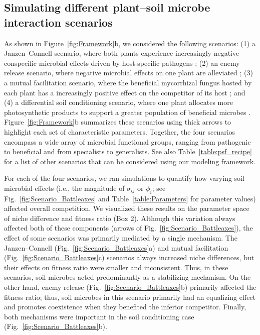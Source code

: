 \subsection{Simulating different plant--soil microbe interaction scenarios}
As shown in Figure~\ref{fig:Framework}b, we considered the following scenarios: (1) a Janzen--Connell scenario, where both plants experience increasingly negative conspecific microbial effects driven by host-specific pathogens \citep{Janzen1970, Connell1971}; (2) an enemy release scenario, where negative microbial effects on one plant are alleviated \citep{Keane2002, Reinhart2006}; (3) a mutual facilitation scenario, where the beneficial mycorrhizal fungus hosted by each plant has a increasingly positive effect on the competitor of its host \citep{Bever2002}; and (4) a differential soil conditioning scenario, where one plant allocates more photosynthetic products to support a greater population of beneficial microbes \citep{Zheng2015, Norby1987}. Figure~\ref{fig:Framework}b summarizes these scenarios using thick arrows to highlight each set of characteristic parameters. Together, the four scenarios encompass a wide array of microbial functional groups, ranging from pathogenic to beneficial and from specialists to generalists. See also Table~\ref{table:psf_recipe} for a list of other scenarios that can be considered using our modeling framework.
\par


For each of the four scenarios, we ran simulations to quantify how varying soil microbial effects (i.e., the magnitude of $\sigma_{ij}$ or $\phi_{i}$; see Fig.~\ref{fig:Scenario_Battleaxes} and Table~\ref{table:Parameters} for parameter values) affected overall competition.
We visualized these results on the parameter space of niche difference and fitness ratio (Box 2). Although this variation always affected both of these components (arrows of Fig.~\ref{fig:Scenario_Battleaxes}), the effect of some scenarios was primarily mediated by a single mechanism.
The Janzen--Connell (Fig.~\ref{fig:Scenario_Battleaxes}a) and mutual facilitation (Fig.~\ref{fig:Scenario_Battleaxes}c) scenarios always increased niche differences, but their effects on fitness ratio were smaller and inconsistent. Thus, in these scenarios, soil microbes acted predominantly as a stabilizing mechanism. On the other hand, enemy release (Fig.~\ref{fig:Scenario_Battleaxes}b) primarily affected the fitness ratio; thus, soil microbes in this scenario primarily had an equalizing effect and promotes coexistence when they benefited the inferior competitor. Finally, both mechanisms were important in the soil conditioning case (Fig.~\ref{fig:Scenario_Battleaxes}b).
\par


